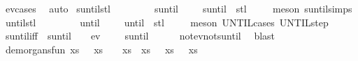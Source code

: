 \begin{isabellebody}
%
\isatagproof
{}\isamarkupfalse%
\ ev{\isachardot}cases\ \isamarkupfalse%
\ auto%
\endisatagproof
{\isafoldproof}%
%
\isadelimproof
\isanewline
%
\endisadelimproof
\isanewline
{}\isamarkupfalse%
\ suntil{\isacharunderscore}stl{\isacharcolon}\ {\isachardoublequoteopen}{\isasymnot}\ {\isasympsi}\ {\isasymomega}\ {\isasymLongrightarrow}\ {\isasymphi}\ {\isasymomega}\ {\isasymLongrightarrow}\ {\isacharparenleft}{\isasymphi}\ suntil\ {\isasympsi}{\isacharparenright}\ {\isasymomega}\ {\isacharequal}\ {\isacharparenleft}{\isasymphi}\ suntil\ {\isasympsi}{\isacharparenright}\ {\isacharparenleft}stl\ {\isasymomega}{\isacharparenright}{\isachardoublequoteclose}\isanewline
%
\isadelimproof
\ \ %
\endisadelimproof
%
\isatagproof
{}\isamarkupfalse%
\ {\isacharparenleft}meson\ suntil{\isachardot}simps{\isacharparenright}%
\endisatagproof
{\isafoldproof}%
%
\isadelimproof
\isanewline
%
\endisadelimproof
\isanewline
{}\isamarkupfalse%
\ until{\isacharunderscore}stl{\isacharcolon}\ {\isachardoublequoteopen}{\isasymnot}\ {\isasympsi}\ {\isasymomega}\ {\isasymLongrightarrow}\ {\isasymphi}\ {\isasymomega}\ {\isasymLongrightarrow}\ {\isacharparenleft}{\isasymphi}\ until\ {\isasympsi}{\isacharparenright}\ {\isasymomega}\ {\isacharequal}\ {\isacharparenleft}{\isasymphi}\ until\ {\isasympsi}{\isacharparenright}\ {\isacharparenleft}stl\ {\isasymomega}{\isacharparenright}{\isachardoublequoteclose}\isanewline
%
\isadelimproof
\ \ %
\endisadelimproof
%
\isatagproof
{}\isamarkupfalse%
\ {\isacharparenleft}meson\ UNTIL{\isachardot}cases\ UNTIL{\isachardot}step{\isacharparenright}%
\endisatagproof
{\isafoldproof}%
%
\isadelimproof
\isanewline
%
\endisadelimproof
\isanewline
{}\isamarkupfalse%
\ suntil{\isacharunderscore}iff{\isacharcolon}\ {\isachardoublequoteopen}{\isacharparenleft}{\isasymphi}\ suntil\ {\isasympsi}{\isacharparenright}\ {\isasymomega}\ {\isasymLongrightarrow}\ ev\ {\isasympsi}\ {\isasymomega}\ {\isasymand}\ {\isacharparenleft}{\isasymphi}\ suntil\ {\isasympsi}{\isacharparenright}\ {\isasymomega}{\isachardoublequoteclose}\isanewline
%
\isadelimproof
\ \ %
\endisadelimproof
%
\isatagproof
{}\isamarkupfalse%
\ not{\isacharunderscore}ev{\isacharunderscore}not{\isacharunderscore}suntil\ \isamarkupfalse%
\ blast%
\endisatagproof
{\isafoldproof}%
%
\isadelimproof
\isanewline
%
\endisadelimproof
\isanewline
{}\isamarkupfalse%
\ de{\isacharunderscore}morgans{\isacharunderscore}fun{\isacharcolon}\ {\isachardoublequoteopen}{\isacharparenleft}{\isasymlambda}xs{\isachardot}\ {\isasymnot}\ {\isasymphi}\ xs\ {\isasymand}\ {\isasymnot}\ {\isasympsi}\ xs{\isacharparenright}\ {\isacharequal}\ {\isacharparenleft}{\isasymlambda}xs{\isachardot}\ {\isasymnot}\ {\isacharparenleft}{\isasymphi}\ xs\ {\isasymor}\ {\isasympsi}\ xs{\isacharparenright}{\isacharparenright}{\isachardoublequoteclose}\isanewline

\end{isabellebody}
